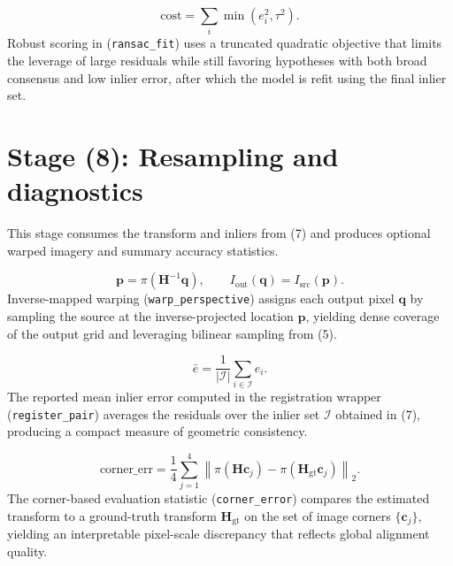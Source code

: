 \documentclass[11pt]{article}
\begin{document}
\begin{equation}
\text{cost}=\sum_i \min(e_i^2,\tau^2).
\end{equation}
Robust scoring in (\texttt{ransac\_fit}) uses a truncated quadratic objective that limits the leverage of large residuals while still favoring hypotheses with both broad consensus and low inlier error, after which the model is refit using the final inlier set.

\section*{Stage (8): Resampling and diagnostics}
This stage consumes the transform and inliers from (7) and produces optional warped imagery and summary accuracy statistics.

\begin{equation}
\mathbf{p}=\pi(\mathbf{H}^{-1}\mathbf{q}),\qquad I_{\text{out}}(\mathbf{q})=I_{\text{src}}(\mathbf{p}).
\end{equation}
Inverse-mapped warping (\texttt{warp\_perspective}) assigns each output pixel $\mathbf{q}$ by sampling the source at the inverse-projected location $\mathbf{p}$, yielding dense coverage of the output grid and leveraging bilinear sampling from (5).

\begin{equation}
\bar e=\frac{1}{|\mathcal{I}|}\sum_{i\in\mathcal{I}} e_i.
\end{equation}
The reported mean inlier error computed in the registration wrapper (\texttt{register\_pair}) averages the residuals over the inlier set $\mathcal{I}$ obtained in (7), producing a compact measure of geometric consistency.

\begin{equation}
\text{corner\_err}=\frac{1}{4}\sum_{j=1}^{4}\left\lVert \pi(\mathbf{H}\mathbf{c}_j)-\pi(\mathbf{H}_{\text{gt}}\mathbf{c}_j)\right\rVert_2.
\end{equation}
The corner-based evaluation statistic (\texttt{corner\_error}) compares the estimated transform to a ground-truth transform $\mathbf{H}_{\text{gt}}$ on the set of image corners $\{\mathbf{c}_j\}$, yielding an interpretable pixel-scale discrepancy that reflects global alignment quality.
\end{document}
